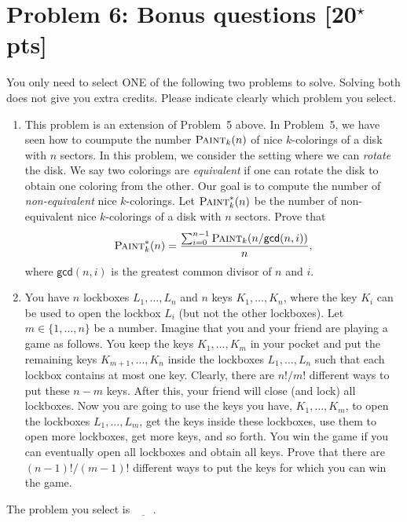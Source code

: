 \documentclass[11pt,twoside]{article}
\newcommand{\problem}[1]{\section*{Problem #1}}
\begin{document}
\problem{6: Bonus questions [20$^\star$ pts]}

{\color{red} You only need to select ONE of the following two problems to solve.
Solving both does not give you extra credits.
Please indicate clearly which problem you select.}

\begin{enumerate}
    \item This problem is an extension of Problem~5 above.
    In Problem~5, we have seen how to coumpute the number $\textsc{Paint}_k(n)$ of nice $k$-colorings of a disk with $n$ sectors.
    In this problem, we consider the setting where we can \textit{rotate} the disk.
    We say two colorings are \textit{equivalent} if one can rotate the disk to obtain one coloring from the other.
    Our goal is to compute the number of \textit{non-equivalent} nice $k$-colorings.
    Let $\textsc{Paint}_k^*(n)$ be the number of non-equivalent nice $k$-colorings of a disk with $n$ sectors.
    Prove that
    \begin{equation*}
        \textsc{Paint}_k^*(n) = \frac{\sum_{i=0}^{n-1} \textsc{Paint}_k(n/\mathsf{gcd}(n,i))}{n},
    \end{equation*}
    where $\mathsf{gcd}(n,i)$ is the greatest common divisor of $n$ and $i$.
    
    \item You have $n$ lockboxes $L_1,\dots,L_n$ and $n$ keys $K_1,\dots,K_n$, where the key $K_i$ can be used to open the lockbox $L_i$ (but not the other lockboxes).
    Let $m \in \{1,\dots,n\}$ be a number.
    Imagine that you and your friend are playing a game as follows.
    You keep the keys $K_1,\dots,K_m$ in your pocket and put the remaining keys $K_{m+1},\dots,K_n$ inside the lockboxes $L_1,\dots,L_n$ such that each lockbox contains at most one key.
    Clearly, there are $n!/m!$ different ways to put these $n-m$ keys.
    After this, your friend will close (and lock) all lockboxes.
    Now you are going to use the keys you have, $K_1,\dots,K_m$, to open the lockboxes $L_1,\dots,L_m$, get the keys inside these lockboxes, use them to open more lockboxes, get more keys, and so forth.
    You win the game if you can eventually open all lockboxes and obtain all keys.
    Prove that there are $(n-1)!/(m-1)!$ different ways to put the keys for which you can win the game.
\end{enumerate}

The problem you select is $\underline{\ \ \ \ \ \ \ \ }$.
\end{document}
